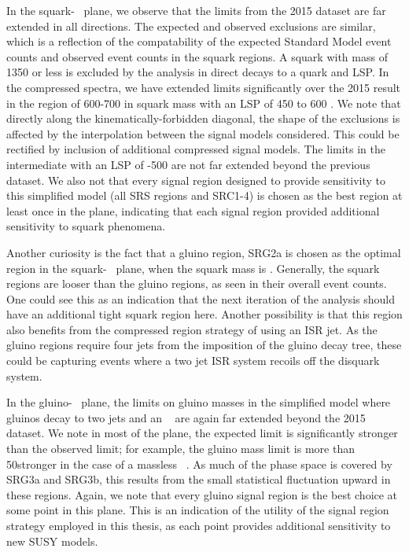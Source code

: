 In the squark-\lsp~ plane, we observe that the limits from the 2015 dataset are far extended in all directions.
The expected and observed exclusions are similar, which is a reflection of the compatability of the expected Standard Model event counts and observed event counts in the squark regions.
A squark with mass of 1350 \GeV or less is excluded by the analysis in direct decays to a quark and LSP.
In the compressed spectra, we have extended limits significantly over the 2015 result in the region of 600-700 \GeV in squark mass with an LSP of 450 \GeV to 600 \GeV.
We note that directly along the kinematically-forbidden diagonal, the shape of the exclusions is affected by the interpolation between the signal models considered.
This could be rectified by inclusion of additional compressed signal models.
The limits in the intermediate with an LSP of -500 \GeV are not far extended beyond the previous dataset.
We also not that every signal region designed to provide sensitivity to this simplified model (all SRS regions and SRC1-4)  is chosen as the best region at least once in the plane, indicating that each signal region provided additional sensitivity to squark phenomena.

Another curiosity is the fact that a gluino region, SRG2a is chosen as the optimal region in the squark-\lsp~ plane, when the squark mass is  \GeV.
Generally, the squark regions are looser than the gluino regions, as seen in their overall event counts.
One could see this as an indication that the next iteration of the analysis should have an additional tight squark region here.
Another possibility is that this region also benefits from the compressed region strategy of using an ISR jet.
As the gluino regions require four jets from the imposition of the gluino decay tree, these could be capturing events where a two jet ISR system recoils off the disquark system.

In the gluino-\lsp~ plane, the limits on gluino masses in the simplified model where gluinos decay to two jets and an \lsp~ are again far extended beyond the 2015 dataset.
We note in most of the plane, the expected limit is significantly stronger than the observed limit; for example, the gluino mass limit is more than 50\GeV stronger in the case of a massless \lsp~.
As much of the phase space is covered by SRG3a and SRG3b, this results from the small statistical fluctuation upward in these regions.
Again, we note that every gluino signal region is the best choice at some point in this plane.
This is an indication of the utility of the signal region strategy employed in this thesis, as each point provides additional sensitivity to new SUSY models.

